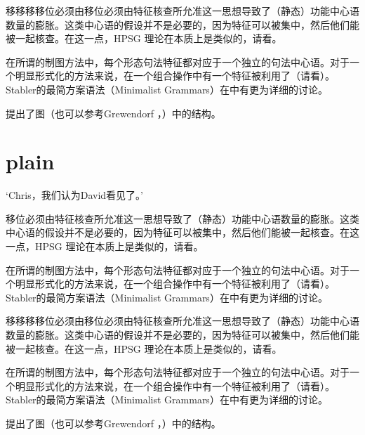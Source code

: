 \documentclass{scrbook}
\let\citew\citealp
\newcommand{\page}{}
\begin{document}
移移移移位必须由移位必须由特征核查所允准这一思想导致了（静态）功能中心语数量的膨胀。这类中心语的假设并不是必要的，因为特征可以被集中，然后他们能被一起核查。在这一点，HPSG 理论在本质上是类似的，请看\citew[\S~II.3.3.4, \S~II.4.2]{Sternefeld2006a-u}。

在所谓的制图方法中，每个形态句法特征都对应于一个独立的句法中心语\citep[\page 54, 61]{CR2010a}。对于一个明显形式化的方法来说，在一个组合操作中有一个特征被利用了（请看\citew[\page 335]{Stabler2001a}）。Stabler的最简方案语法（Minimalist Grammars）在中有更为详细的讨论。

\citet[\page 297]{Rizzi97a-u}提出了图（也可以参考Grewendorf \citeyear[\page 85, 240]{Grewendorf2002a}，\citeyear{Grewendorf2009a}）中的结构。
              
\section{plain}


    `Chris，我们认为David看见了。'

移位必须由特征核查所允准这一思想导致了（静态）功能中心语数量的膨胀。这类中心语的假设并不是必要的，因为特征可以被集中，然后他们能被一起核查。在这一点，HPSG 理论在本质上是类似的，请看\citew[\S~II.3.3.4, \S~II.4.2]{Sternefeld2006a-u}。

在所谓的制图方法中，每个形态句法特征都对应于一个独立的句法中心语\citep[\page 54, 61]{CR2010a}。对于一个明显形式化的方法来说，在一个组合操作中有一个特征被利用了（请看\citew[\page 335]{Stabler2001a}）。Stabler的最简方案语法（Minimalist Grammars）在中有更为详细的讨论。

移移移移位必须由移位必须由特征核查所允准这一思想导致了（静态）功能中心语数量的膨胀。这类中心语的假设并不是必要的，因为特征可以被集中，然后他们能被一起核查。在这一点，HPSG 理论在本质上是类似的，请看\citew[\S~II.3.3.4, \S~II.4.2]{Sternefeld2006a-u}。

在所谓的制图方法中，每个形态句法特征都对应于一个独立的句法中心语\citep[\page 54, 61]{CR2010a}。对于一个明显形式化的方法来说，在一个组合操作中有一个特征被利用了（请看\citew[\page 335]{Stabler2001a}）。Stabler的最简方案语法（Minimalist Grammars）在中有更为详细的讨论。

\citet[\page 297]{Rizzi97a-u}提出了图（也可以参考Grewendorf \citeyear[\page 85, 240]{Grewendorf2002a}，\citeyear{Grewendorf2009a}）中的结构。



 


    
\end{document}
